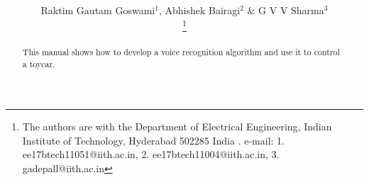 \documentclass[journal,12pt,twocolumn]{IEEEtran}
\begin{document}
\def\putbox#1#2#3{\makebox[0in][l]{\makebox[#1][l]{}\raisebox{\baselineskip}[0in][0in]{\raisebox{#2}[0in][0in]{#3}}}}
     \def\rightbox#1{\makebox[0in][r]{#1}}
     \def\centbox#1{\makebox[0in]{#1}}
     \def\topbox#1{\raisebox{-\baselineskip}[0in][0in]{#1}}
     \def\midbox#1{\raisebox{-0.5\baselineskip}[0in][0in]{#1}}

\vspace{3cm}

\title{ 
}
\author{Raktim Gautam Goswami$^{1}$, Abhishek Bairagi$^{2}$ \& G V V Sharma$^{3}$ 

\thanks{The authors are with the Department
of Electrical Engineering, Indian Institute of Technology, Hyderabad
502285 India .  e-mail: 1. ee17btech11051@iith.ac.in, 2. ee17btech11004@iith.ac.in,  
3. gadepall@iith.ac.in}%

}




\maketitle

\tableofcontents

\renewcommand{\thefigure}{\theenumi}
\renewcommand{\thetable}{\theenumi}


\bigskip

\begin{abstract}
%
This manual shows how to develop a voice recognition algorithm and use it to 
control a toycar. 
%
\end{abstract}
\end{document}
